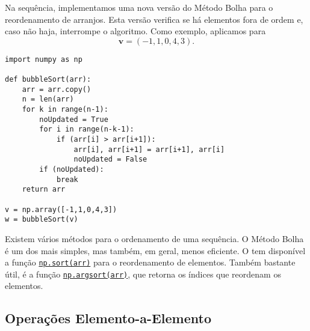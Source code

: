 \begin{ex}
  Na sequência, implementamos uma nova versão do Método Bolha para o reordenamento de arranjos. Esta versão verifica se há elementos fora de ordem e, caso não haja, interrompe o algoritmo. Como exemplo, aplicamos para
  \begin{equation}
    \pmb{v} = (-1, 1, 0, 4, 3).
  \end{equation}
  
\begin{lstlisting}[caption=bubbleSort\_v2.py]
import numpy as np

def bubbleSort(arr):
    arr = arr.copy()
    n = len(arr)
    for k in range(n-1):
        noUpdated = True
        for i in range(n-k-1):
            if (arr[i] > arr[i+1]):
                arr[i], arr[i+1] = arr[i+1], arr[i]
                noUpdated = False
        if (noUpdated):
            break
    return arr

v = np.array([-1,1,0,4,3])
w = bubbleSort(v)
\end{lstlisting}

\end{ex}

\begin{obs}
  Existem vários métodos para o ordenamento de uma sequência. O Método Bolha é um dos mais simples, mas também, em geral, menos eficiente. O {\numpy} tem disponível a função \href{https://numpy.org/doc/stable/reference/generated/numpy.sort.html}{\lstinline+np.sort(arr)+} para o reordenamento de elementos. Também bastante útil, é a função \href{https://numpy.org/doc/stable/reference/generated/numpy.argsort.html}{\lstinline+np.argsort(arr)+}, que retorna os índices que reordenam os elementos.
\end{obs}

\subsection{Operações Elemento-a-Elemento}

